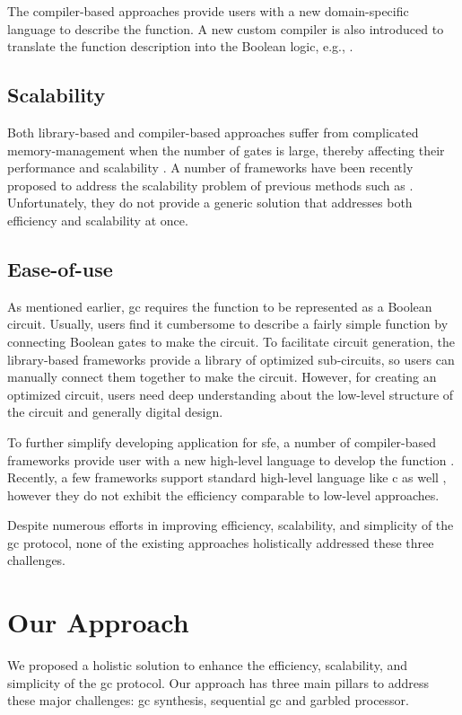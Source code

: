 The compiler-based approaches provide users with a new domain-specific language to describe the function.
A new custom compiler is also introduced to translate the function description into the Boolean logic, e.g., \cite{malkhi2004fairplay,kreuter2012billion,kreuter2013pcf,franz2014cbmc}.

\subsection{Scalability}
Both library-based and compiler-based approaches suffer from complicated memory-management when the number of gates is large, thereby affecting their performance and scalability \cite{henecka2013faster, kreuter2013pcf}.
A number of frameworks have been recently proposed to address the scalability problem of previous methods such as \cite{malka2011vmcrypt, mood2012memory, kreuter2012billion, kreuter2013pcf}.
Unfortunately, they do not provide a generic solution that addresses both efficiency and scalability at once.

\subsection{Ease-of-use}
As mentioned earlier, \acrshort{gc} requires the function to be represented as a Boolean circuit.
Usually, users find it cumbersome to describe a fairly simple function by connecting Boolean gates to make the circuit.
To facilitate circuit generation, the library-based frameworks provide a library of optimized sub-circuits, so users can manually connect them together to make the circuit.
However, for creating an optimized circuit, users need deep understanding about the low-level structure of the circuit and generally digital design.

To further simplify developing application for \acrshort{sfe}, a number of compiler-based frameworks provide user with a new high-level language to develop the function \cite{mood2012memory,kreuter2012billion,kreuter2013pcf,liu2015oblivm}.
Recently, a few frameworks support standard high-level language like \gls{c} as well \cite{holzer2012secure, franz2014cbmc, zahur2015obliv, mood2016frigate}, however they do not exhibit the efficiency comparable to low-level approaches.

Despite numerous efforts in improving efficiency, scalability, and simplicity of the \acrshort{gc} protocol, none of the existing approaches holistically addressed these three challenges.

\section{Our Approach}
We proposed a holistic solution to enhance the efficiency, scalability, and simplicity of the \acrshort{gc} protocol.
Our approach has three main pillars to address these major challenges: \acrlong{gc} synthesis, sequential \acrlong{gc} and garbled processor.

